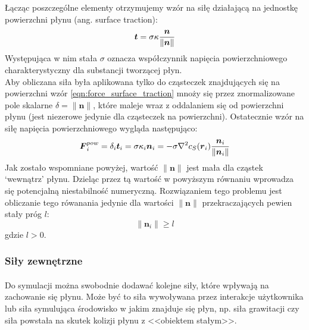 Łącząc poszczególne elementy otrzymujemy wzór na siłę działającą na jednostkę powierzchni płynu (ang. surface traction):
\begin{equation}
\boldsymbol{t} = \sigma \kappa {\boldsymbol{n} \over \|\boldsymbol{n}\|}
\label{eqn:force_surface_traction}
\end{equation}
Występująca w nim stała $\sigma$ oznacza współczynnik napięcia powierzchniowego charakterystyczny dla substancji tworzącej płyn.\\
Aby obliczana siła była aplikowana tylko do cząsteczek znajdujących się na powierzchni wzór \eqref{eqn:force_surface_traction} mnoży się przez znormalizowane pole skalarne $\delta = \|\boldsymbol{n}\|$, które maleje wraz z oddalaniem się od powierzchni płynu (jest niezerowe jedynie dla cząsteczek na powierzchni). Ostatecznie wzór na siłę napięcia powierzchniowego wygląda następująco:
\begin{equation}
\boldsymbol{F}_i^{pow} = \delta_i \boldsymbol{t}_i = \sigma \kappa_i \boldsymbol{n}_i = - \sigma \nabla^2{c}_S(\boldsymbol{r}_i) {\boldsymbol{n}_i \over \|\boldsymbol{n}_i\|}
\label{eqn:sph_force_surface_tension}
\end{equation}
Jak zostało wspomniane powyżej, wartość $\|\boldsymbol{n}\|$ jest mała dla cząstek `wewnątrz' płynu. Dzieląc przez tą wartość w powyższym równaniu wprowadza się potencjalną niestabilność numeryczną. Rozwiązaniem tego problemu jest obliczanie tego rówanania jedynie dla wartości $\|\boldsymbol{n}\|$ przekraczających pewien stały próg $l$:
\begin{equation}
\|\boldsymbol{n}_i\| \geq l
\end{equation}
gdzie $l > 0$.\\
\par

\subsubsection{Siły zewnętrzne}

\paragraph{}
Do symulacji można swobodnie dodawać kolejne siły, które wpływają na zachowanie się płynu. Może być to siła wywoływana przez interakcje użytkownika lub siła symulująca środowisko w jakim znajduje się płyn, np. siła grawitacji czy siła powstała na skutek kolizji płynu z <<obiektem stałym>>.
\par


